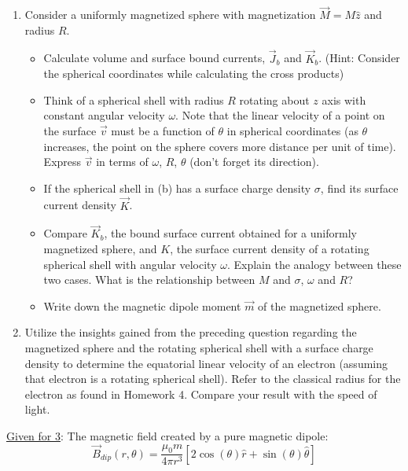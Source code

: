 \documentclass[12pt]{article}
\begin{document}
\begin{enumerate}
    \item Consider a uniformly magnetized sphere with magnetization $\vec{M}=M\hat{z}$ and radius $R$.
    \begin{itemize}
        \item [(a)] Calculate volume and surface bound currents, $\vec{J}_b$ and $\vec{K}_b$. (Hint: Consider the spherical coordinates while calculating the cross products)
        \item [(b)] Think of a spherical shell with radius $R$ rotating about $z$ axis with constant angular velocity $\omega$. Note that the linear velocity of a point on the surface $\vec{v}$ must be a function of $\theta$ in spherical coordinates (as $\theta$ increases, the point on the sphere covers more distance per unit of time). Express $\vec{v}$ in terms of $\omega$, $R$, $\theta$ (don't forget its direction). 
        \item [(c)] If the spherical shell in (b) has a surface charge density $\sigma$, find its surface current density $\vec{K}$.
        \item [(d)] Compare $\vec{K}_b$, the bound surface current obtained for a uniformly magnetized sphere, and $K$, the surface current density of a rotating spherical shell with angular velocity $\omega$. Explain the analogy between these two cases. What is the relationship between $M$ and $\sigma$, $\omega$ and $R$? 
        \item [(e)] Write down the magnetic dipole moment $\vec{m}$ of the magnetized sphere.
    \end{itemize}
    \item Utilize the insights gained from the preceding question regarding the magnetized sphere and the rotating spherical shell with a surface charge density to determine the equatorial linear velocity of an electron (assuming that electron is a rotating spherical shell). Refer to the classical radius for the electron as found in Homework 4. Compare your result with the speed of light.
\end{enumerate}

\underline{Given for 3}: The magnetic field created by a pure magnetic dipole:
\begin{equation*}
    \vec{B}_{dip}(r,\theta) = \frac{\mu_0 m}{4\pi r^3}\left[2\cos{\left(\theta\right)}\hat{r} + \sin{\left(\theta\right)}\hat{\theta}\right]
\end{equation*}
\end{document}
